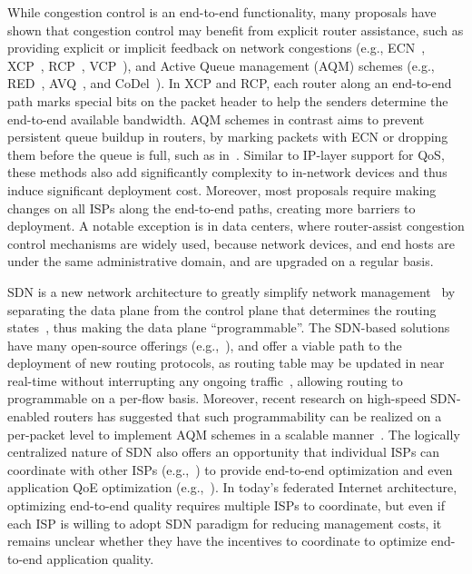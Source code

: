 While congestion control is an end-to-end functionality, many 
proposals have shown that congestion control may benefit from 
explicit router assistance, such as providing explicit or implicit 
feedback on network congestions 
(e.g., ECN~\cite{ecn},
XCP~\cite{xcp}, RCP~\cite{rcp}, VCP~\cite{vcp}),
and Active Queue management (AQM) schemes (e.g., RED~\cite{red},
AVQ~\cite{avq}, and CoDel~\cite{codel}).
In XCP and RCP, each router along an end-to-end path marks 
special bits on the packet header to help the senders determine the 
end-to-end available bandwidth. 
AQM schemes in contrast aims to prevent persistent queue buildup
in routers, by marking packets with ECN or dropping them before 
the queue is full, such as in~\cite{red}.
Similar to IP-layer support for QoS, 
these methods also add significantly complexity to in-network
devices and thus induce significant deployment cost.
Moreover, most proposals require making changes 
on all ISPs along the end-to-end paths, creating more
barriers to deployment.
A notable exception is in data centers, where 
router-assist congestion control mechanisms are widely used, 
because network devices, and end hosts are under the same 
administrative domain, and are upgraded on a regular basis.


SDN is a new network architecture 
to greatly simplify network management~\cite{feamster2014road}
by separating the data plane from the control plane that determines 
the routing states~\cite{OpenFlow}, thus making the data plane 
``programmable''.
The SDN-based solutions have  many open-source offerings
(e.g.,~\cite{onos,floodlightopenflow}), and offer a viable path to
the deployment of new routing 
protocols, as routing table may be updated in near real-time without
interrupting any ongoing traffic~\cite{rexford-sdn-update},
allowing routing to programmable on a per-flow basis.
Moreover, recent research on high-speed SDN-enabled routers has 
suggested that such programmability can be realized on a per-packet level 
to implement AQM schemes  in a scalable 
manner~\cite{sivaraman2016programmable,sivaraman2016packet}.
The logically centralized nature of SDN also offers an opportunity
that individual ISPs can coordinate with other ISPs
(e.g.,~\cite{schapira2010putting}) to provide end-to-end optimization
and even application QoE optimization (e.g.,~\cite{sdndash}).
In today's federated Internet architecture, optimizing 
end-to-end quality requires multiple ISPs to coordinate, but 
even if each ISP is willing to adopt SDN paradigm for reducing management costs,
it remains unclear whether they have the incentives to coordinate
to optimize end-to-end application quality.

